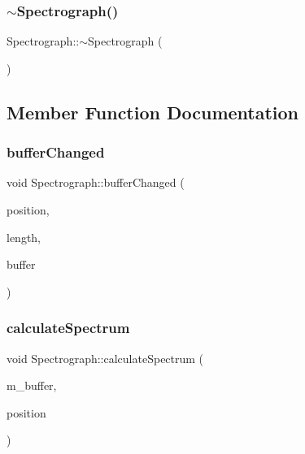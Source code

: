 \subsubsection{\texorpdfstring{$\sim$\+Spectrograph()}{~Spectrograph()}}
{\footnotesize\ttfamily Spectrograph\+::$\sim$\+Spectrograph (\begin{DoxyParamCaption}{ }\end{DoxyParamCaption})}



\subsection{Member Function Documentation}
\hypertarget{class_spectrograph_af6a83c1feec2657104a983ae334ceae3}{}\label{class_spectrograph_af6a83c1feec2657104a983ae334ceae3} 
\subsubsection{\texorpdfstring{buffer\+Changed}{bufferChanged}}
{\footnotesize\ttfamily void Spectrograph\+::buffer\+Changed (\begin{DoxyParamCaption}\item[{qint64}]{position,  }\item[{qint64}]{length,  }\item[{const Q\+Byte\+Array \&}]{buffer }\end{DoxyParamCaption})\hspace{0.3cm}{\ttfamily [slot]}}

\hypertarget{class_spectrograph_aec6520868d48dc83485d6716b977f65b}{}\label{class_spectrograph_aec6520868d48dc83485d6716b977f65b} 
\subsubsection{\texorpdfstring{calculate\+Spectrum}{calculateSpectrum}}
{\footnotesize\ttfamily void Spectrograph\+::calculate\+Spectrum (\begin{DoxyParamCaption}\item[{Q\+Byte\+Array \&}]{m\+\_\+buffer,  }\item[{qint64}]{position }\end{DoxyParamCaption})\hspace{0.3cm}{\ttfamily [slot]}}

